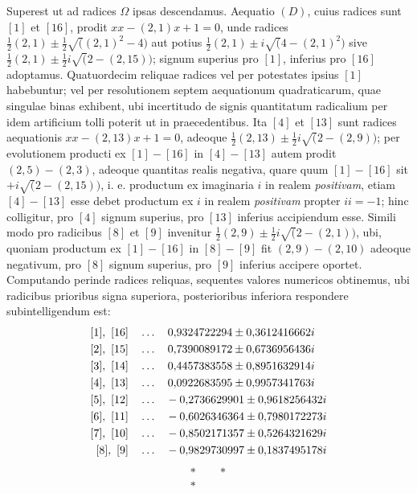 Superest ut ad radices \(\Omega\) ipsas descendamus. Aequatio \((D)\), cuius radices sunt \([1]\) et \([16]\), prodit \(xx-(2,1)x+1=0\), unde radices \(\frac12(2,1)\pm\frac12\surd((2,1)^2-4)\) aut potius \(\frac12(2,1)\pm i\surd(4-(2,1)^2)\) sive \(\frac12(2,1)\pm\frac12i\surd(2-(2,15))\); signum superius pro \([1]\), inferius pro \([16]\) adoptamus. Quatuordecim reliquae radices vel per potestates ipsius \([1]\) habebuntur; vel per resolutionem septem aequationum quadraticarum, quae singulae binas exhibent, ubi incertitudo de signis quantitatum radicalium per idem artificium tolli poterit ut in praecedentibus. Ita \([4]\) et \([13]\) sunt radices aequationis \(xx-(2,13)x+1=0\), adeoque \(\frac12(2,13)\pm\frac12i\surd(2-(2,9))\); per evolutionem producti ex \([1]-[16]\) in \([4]-[13]\) autem prodit \((2,5)-(2,3)\), adeoque quantitas realis negativa, quare quum \([1]-[16]\) sit \(+i\surd(2-(2,15))\), i. e. productum ex imaginaria \(i\) in realem \textit{positivam}, etiam \([4]-[13]\) esse debet productum ex \(i\) in realem \textit{positivam} propter \(ii=-1\); hinc colligitur, pro \([4]\) signum superius, pro \([13]\) inferius accipiendum esse. Simili modo pro radicibus \([8]\) et \([9]\) invenitur \(\frac12(2,9)\pm\frac12i\surd(2-(2,1))\), ubi, quoniam productum ex \([1]-[16]\) in \([8]-[9]\) fit \((2,9)-(2,10)\) adeoque negativum, pro \([8]\) signum superius, pro \([9]\) inferius accipere oportet. Computando perinde radices reliquas, sequentes valores numericos obtinemus, ubi radicibus prioribus signa superiora, posterioribus inferiora respondere subintelligendum est:
\[\begin{aligned}\relax[1],\ [16]&\quad\ldots\quad 0{,}9324722294\pm 0{,}3612416662i\\\relax [2],\ [15]&\quad\ldots\quad 0{,}7390089172\pm 0{,}6736956436i\\\relax [3],\ [14]&\quad\ldots\quad 0{,}4457383558\pm 0{,}8951632914i\\\relax [4],\ [13]&\quad\ldots\quad 0{,}0922683595\pm 0{,}9957341763i\\\relax [5],\ [12]&\quad\ldots\quad -0{,}2736629901\pm 0{,}9618256432i\\\relax [6],\ [11]&\quad\ldots\quad -0{,}6026346364\pm 0{,}7980172273i\\\relax [7],\ [10]&\quad\ldots\quad -0{,}8502171357\pm 0{,}5264321629i\\\relax [8],\ [9]&\quad\ldots\quad -0{,}9829730997\pm 0{,}1837495178i\end{aligned}\] \[\begin{matrix}*\qquad *\\{}*\end{matrix}\]

